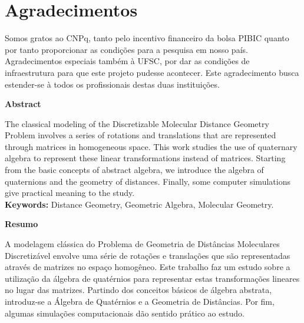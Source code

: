 \documentclass[a4paper,12pt]{report}
\theoremstyle{plain}
\theoremstyle{definition}
\begin{document}
	
	\newpage
	
	\chapter*{Agradecimentos}
	
	Somos gratos ao CNPq, tanto pelo incentivo financeiro da bolsa PIBIC quanto por tanto proporcionar as condições para a pesquisa em nosso país. Agradecimentos especiais também à UFSC, por dar as condições de infraestrutura para que este projeto pudesse acontecer. Este agradecimento busca estender-se à todos os profissionais destas duas instituições.
	
	\newpage
	\tableofcontents
	\newpage
	
	\begin{center}
		\large
		\textbf{Abstract}
	\end{center}
	
	\noindent The classical modeling of the Discretizable Molecular Distance Geometry Problem involves a series of rotations and translations that are represented through matrices in homogeneous space. This work studies the use of quaternary algebra to represent these linear transformations instead of matrices. Starting from the basic concepts of abstract algebra, we introduce the algebra of quaternions and the geometry of distances. Finally, some computer simulations give practical meaning to the study.
	\\
	
	\noindent\textbf{Keywords:} Distance Geometry, Geometric Algebra, Molecular Geometry.
	
	
	\vspace{2cm}	
	\begin{center}
		\large
		\textbf{Resumo}
	\end{center}
	
	\noindent A modelagem clássica do Problema de Geometria de Distâncias Moleculares Discretizável envolve uma série de rotações e translações que são representadas através de matrizes no espaço homogêneo. Este trabalho faz um estudo sobre a utilização da álgebra de quatérnios para representar estas transformações lineares no lugar das matrizes. Partindo dos conceitos básicos de álgebra abstrata, introduz-se a Álgebra de Quatérnios e a Geometria de Distâncias. Por fim, algumas simulações computacionais dão sentido prático ao estudo.
	\\
	
\end{document}
